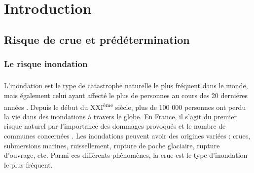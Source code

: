%
%
%
%
%
%
%

\chapter*{Introduction}
\label{chap:intro}

\section*{Risque de crue et prédétermination}

	\subsection*{Le risque inondation}
	\paragraph{} L'inondation est le type de catastrophe naturelle le plus fréquent dans le monde, mais également celui ayant affecté le plus de personnes au cours des 20 dernières années \citep{undrr_human_2020}. Depuis le début du XXI\textsuperscript{ème} siècle, plus de 100 000 personnes ont perdu la vie dans des inondations à travers le globe. En France, il s'agit du premier risque naturel par l'importance des dommages provoqués et le nombre de communes concernées \citep{medd_prevention_2023}. Les inondations peuvent avoir des origines variées : crues, submersions marines, ruissellement, rupture de poche glaciaire, rupture d'ouvrage, etc. Parmi ces différents phénomènes, la crue est le type d'inondation le plus fréquent. 
	
